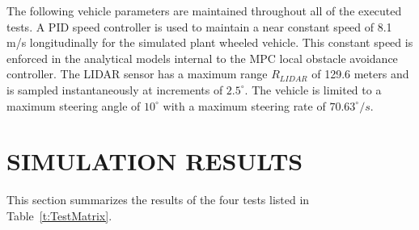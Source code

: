 \documentclass[12pt,twocolumn]{article}
\newcommand{\CHRONO}{{\sffamily{{Chrono}}}}
\begin{document}
The following vehicle parameters are maintained throughout all of the executed tests. A PID speed controller is used to maintain a near constant speed of 8.1 m/s longitudinally for the simulated plant {\CHRONO} wheeled vehicle. This constant speed is enforced in the analytical models internal to the MPC local obstacle avoidance controller. The LIDAR sensor has a maximum range $R_{LIDAR}$ of 129.6 meters and is sampled instantaneously at increments of $2.5^\circ$. The vehicle is limited to a maximum steering angle of $10^\circ$ with a maximum steering rate of  $70.63^{\circ}/s$. 


\section{SIMULATION RESULTS}\label{s:results}

This section summarizes the results of the four tests listed in Table~\ref{t:TestMatrix}. 
\end{document}
